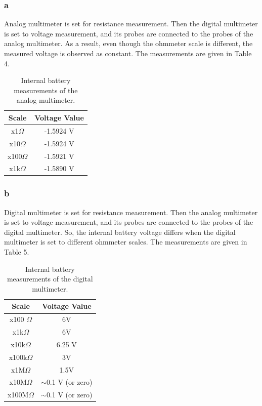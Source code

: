 \documentclass[letterpaper,12pt]{article}
\begin{document}
\subsubsection{a}
Analog multimeter is set for resistance measurement. Then the digital multimeter is set to voltage measurement, and its probes are connected to the probes of the analog multimeter. As a result, even though the ohmmeter scale is different, the measured voltage is observed as constant. The measurements are given in Table 4.
\begin{table}[H]
	\begin{center}
	\caption{Internal battery measurements of the analog multimeter.}	
	\vspace{2mm}
	\begin{tabular}{|| c | c ||}
	\hline
	Scale              & Voltage Value \\[0.5ex] 
	\hline\hline
	x1\( \Omega \)   & -1.5924 V     \\
	\hline
	x10\( \Omega \)  & -1.5924 V     \\
	\hline
	x100\( \Omega \) & -1.5921 V     \\
	\hline
	x1k\( \Omega \)  & -1.5890 V   \\
	\hline
	\end{tabular}
	
\end{center}
\end{table}

\subsubsection{b}
Digital multimeter is set for resistance measurement. Then the analog multimeter is set to voltage measurement, and its probes are connected to the probes of the digital multimeter. So, the internal battery voltage differs when the digital multimeter is set to different ohmmeter scales. The measurements are given in Table 5.
\begin{table}[H]
	\centering
	\caption{Internal battery measurements of the digital multimeter.}
	\vspace{2mm}
	\begin{tabular}{|| c | c ||}
		\hline
	Scale & Voltage Value \\\hline
	\hline
	x100 \( \Omega \) & 6V \\\hline
	x1k\( \Omega \) & 6V \\\hline
	x10k\( \Omega \) & 6.25 V \\\hline
	x100k\( \Omega \) & 3V \\\hline
	x1M\( \Omega \) & 1.5V \\\hline
	x10M\( \Omega \) & $\sim$0.1 V (or zero) \\\hline
	x100M\( \Omega \) & $\sim$0.1 V (or zero) \\\hline
	\end{tabular}
	
\end{table}
\end{document}
